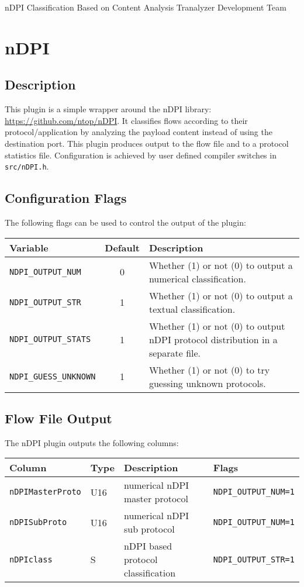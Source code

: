 \documentclass[documentation]{subfiles}
\begin{document}
\trantitle
    {nDPI}
    {Classification Based on Content Analysis}
    {Tranalyzer Development Team}

\section{nDPI}\label{s:nDPI}

\subsection{Description}
This plugin is a simple wrapper around the nDPI library: \url{https://github.com/ntop/nDPI}.
It classifies flows according to their protocol/application by analyzing the payload content
instead of using the destination port. This plugin produces output to the flow file and to
a protocol statistics file. Configuration is achieved by user defined compiler switches in
{\tt src/nDPI.h}.

\subsection{Configuration Flags}
The following flags can be used to control the output of the plugin:
\begin{longtable}{lcl}
    \toprule
    {\bf Variable} & {\bf Default} & {\bf Description} \\
    \midrule\endhead%
    {\tt NDPI\_OUTPUT\_NUM}   & 0 & Whether (1) or not (0) to output a numerical classification.\\
    {\tt NDPI\_OUTPUT\_STR}   & 1 & Whether (1) or not (0) to output a textual classification.\\
    {\tt NDPI\_OUTPUT\_STATS} & 1 & Whether (1) or not (0) to output nDPI protocol distribution in a separate file.\\
    {\tt NDPI\_GUESS\_UNKNOWN} & 1 & Whether (1) or not (0) to try guessing unknown protocols.\\
    \bottomrule
\end{longtable}

\subsection{Flow File Output}
The nDPI plugin outputs the following columns:
\begin{longtable}{llll}
    \toprule
    {\bf Column} & {\bf Type} & {\bf Description} & {\bf Flags}\\
    \midrule\endhead%
    {\tt nDPIMasterProto} & U16 & numerical nDPI master protocol     & {\tt NDPI\_OUTPUT\_NUM=1}\\
    {\tt nDPISubProto}    & U16 & numerical nDPI sub protocol        & {\tt NDPI\_OUTPUT\_NUM=1}\\
    {\tt nDPIclass}       & S   & nDPI based protocol classification & {\tt NDPI\_OUTPUT\_STR=1}\\
    \bottomrule
\end{longtable}
\end{document}
